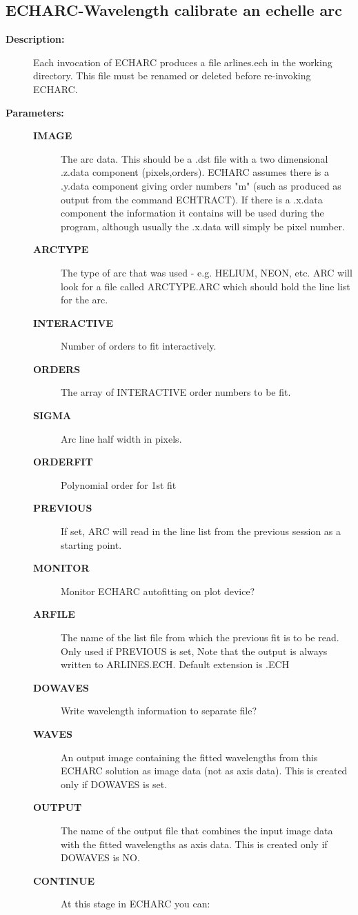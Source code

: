 \begin{description}
\subsection{ECHARC-\label{ECHARC}Wavelength calibrate an echelle arc}
\begin{description}

\item [\textbf{Description:}]
 Each invocation of ECHARC produces a file arlines.ech in the working
 directory.  This file must be renamed or deleted before re-invoking
 ECHARC.

\item [\textbf{Parameters:}]
\begin{description}
\item [\textbf{IMAGE}]
 The arc data.  This should be a .dst file with a two dimensional
 .z.data component (pixels,orders). ECHARC assumes there is a
 .y.data component giving order numbers "m"   (such as produced as
 output from the command ECHTRACT).  If there is a .x.data component
 the information it contains will be used during the program,
 although usually the .x.data will simply be pixel number.
\item [\textbf{ARCTYPE}]
 The type of arc that was used - e.g. HELIUM, NEON, etc.  ARC will look
 for a file called ARCTYPE.ARC which should hold the line list for the
 arc.
\item [\textbf{INTERACTIVE}]
 Number of orders to fit interactively.
\item [\textbf{ORDERS}]
 The array of INTERACTIVE order numbers to be fit.
\item [\textbf{SIGMA}]
 Arc line half width in pixels.
\item [\textbf{ORDERFIT}]
 Polynomial order for 1st fit
\item [\textbf{PREVIOUS}]
 If set, ARC will read in the line list from the previous
 session as a starting point.
\item [\textbf{MONITOR}]
 Monitor ECHARC autofitting on plot device?
\item [\textbf{ARFILE}]
 The name of the list file from which the previous fit is to be read.
 Only used if PREVIOUS is set, Note that the output is always
 written to ARLINES.ECH.  Default extension is .ECH
\item [\textbf{DOWAVES}]
 Write wavelength information to separate file?
\item [\textbf{WAVES}]
 An output image containing the fitted wavelengths from this ECHARC
 solution as image data (not as axis data).  This is created only if
 DOWAVES is set.
\item [\textbf{OUTPUT}]
 The name of the output file that combines the input image data
 with the fitted wavelengths as axis data. This is created only
 if DOWAVES is NO.
\item [\textbf{CONTINUE}]
 At this stage in ECHARC you can:


\end{description}
\end{description}
\end{description}
